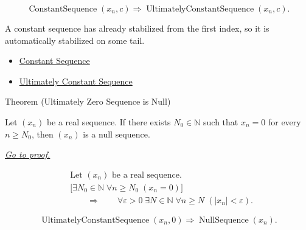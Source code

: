 \begin{remark*}
\[
\operatorname{ConstantSequence}(x_n,c)
\Longrightarrow
\operatorname{UltimatelyConstantSequence}(x_n,c).
\]
\end{remark*}

\begin{remark*}[Interpretation]
A constant sequence has already stabilized from the first index, so it is
automatically stabilized on some tail.
\end{remark*}

\begin{dependencies}
\begin{itemize}
  \item \hyperref[def:constant-sequence]{Constant Sequence}
  \item \hyperref[def:ultimately-constant-sequence]{Ultimately Constant Sequence}
\end{itemize}
\end{dependencies}


\begin{theorembox}{Theorem (Ultimately Zero Sequence is Null)}
\begin{theorem}
\label{thm:ultimately-zero-sequence-is-null}
Let $(x_n)$ be a real sequence. If there exists $N_0 \in \mathbb{N}$ such
that $x_n = 0$ for every $n \ge N_0$, then $(x_n)$ is a null sequence.

\smallskip
\noindent
\hyperref[prf:ultimately-zero-sequence-is-null]{\textit{Go to proof.}}
\end{theorem}
\end{theorembox}

\begin{remark*}
\[
\begin{aligned}
&\text{Let } (x_n) \text{ be a real sequence.}\\
&\bigl[
\exists N_0 \in \mathbb{N}\;
\forall n \ge N_0\;(x_n = 0)
\bigr]\\
&\qquad\Longrightarrow\qquad
\forall \varepsilon > 0\;
\exists N \in \mathbb{N}\;
\forall n \ge N\;(|x_n| < \varepsilon).
\end{aligned}
\]
\end{remark*}

\begin{remark*}
\[
\operatorname{UltimatelyConstantSequence}(x_n,0)
\Longrightarrow
\operatorname{NullSequence}(x_n).
\]
\end{remark*}

